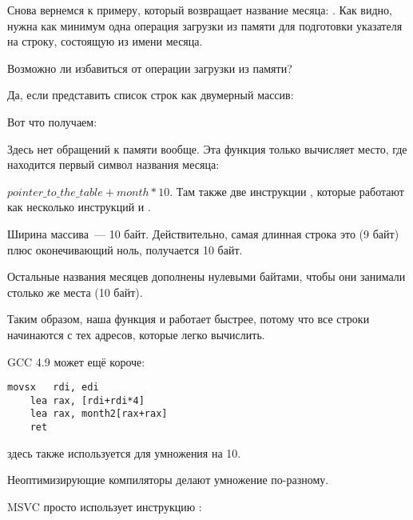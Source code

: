
Снова вернемся к примеру, который возвращает название месяца: .
Как видно, нужна как минимум одна операция загрузки из памяти для подготовки указателя на строку,
состоящую из имени месяца.

Возможно ли избавиться от операции загрузки из памяти?

Да, если представить список строк как двумерный массив:



Вот что получаем:



Здесь нет обращений к памяти вообще.
Эта функция только вычисляет место, где находится первый символ названия месяца:
 
$pointer\_to\_the\_table + month * 10$.
Там также две инструкции \LEA, которые работают как несколько инструкций \MUL и \MOV.

Ширина массива~--- 10 байт. 
Действительно, самая длинная строка это  (9 байт) плюс оконечивающий ноль, получается 10 байт.

Остальные названия месяцев дополнены нулевыми байтами, чтобы они занимали столько же места (10 байт).

Таким образом, наша функция и работает быстрее, потому что все строки начинаются с тех адресов, 
которые легко вычислить.

\Optimizing GCC 4.9 может ещё короче:

\begin{lstlisting}[caption=\Optimizing GCC 4.9 x64]
	movsx	rdi, edi
	lea	rax, [rdi+rdi*4]
	lea	rax, month2[rax+rax]
	ret
\end{lstlisting}

\LEA здесь также используется для умножения на 10.

Неоптимизирующие компиляторы делают умножение по-разному.



\NonOptimizing MSVC просто использует инструкцию \IMUL:



